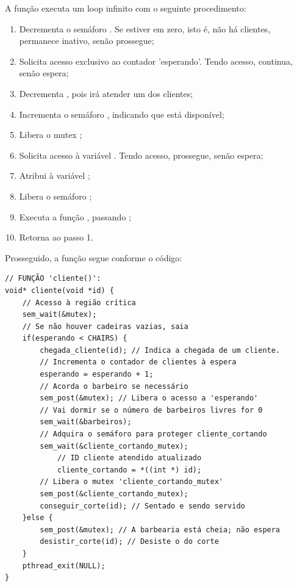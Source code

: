 \documentclass[
	12pt,				%
	openright,			%
	oneside,			%
	a4paper,			%
	chapter=TITLE,		%
	english,			%
	french,				%
	spanish,			%
	brazil				%
	]{abntex2}
\theoremstyle{definition}
\begin{document}
A função  executa um loop infinito com o seguinte procedimento:

\begin{enumerate}
    \item Decrementa o semáforo . Se estiver em zero, isto é, não há clientes, permanece inativo, senão prossegue;
    \item Solicita acesso exclusivo ao contador 'esperando'. Tendo acesso, continua, senão espera;
    \item Decrementa , pois irá atender um dos clientes;
    \item Incrementa o semáforo , indicando que está disponível;
    \item Libera o mutex ;
    \item Solicita acesso à variável . Tendo acesso, prossegue, senão espera;
    \item Atribui  à variável ;
    \item Libera o semáforo ;
    \item Executa a função , passando ;
    \item Retorna ao passo 1.
\end{enumerate}

Prosseguido, a função  segue conforme o código:

\begin{verbatim}
// FUNÇÃO 'cliente()':
void* cliente(void *id) {
    // Acesso à região crítica
    sem_wait(&mutex); 
    // Se não houver cadeiras vazias, saia 
    if(esperando < CHAIRS) { 
        chegada_cliente(id); // Indica a chegada de um cliente.
        // Incrementa o contador de clientes à espera
        esperando = esperando + 1;
        // Acorda o barbeiro se necessário 
        sem_post(&mutex); // Libera o acesso a 'esperando' 
        // Vai dormir se o número de barbeiros livres for 0 
        sem_wait(&barbeiros);
        // Adquira o semáforo para proteger cliente_cortando
        sem_wait(&cliente_cortando_mutex); 
            // ID cliente atendido atualizado
            cliente_cortando = *((int *) id);
        // Libera o mutex 'cliente_cortando_mutex'
        sem_post(&cliente_cortando_mutex);
        conseguir_corte(id); // Sentado e sendo servido 
    }else {
        sem_post(&mutex); // A barbearia está cheia; não espera 
        desistir_corte(id); // Desiste o do corte
    }
    pthread_exit(NULL);
}
\end{verbatim}
\end{document}
